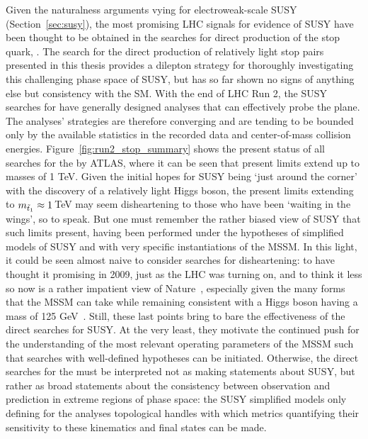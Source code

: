 Given the naturalness arguments vying for electroweak-scale SUSY (Section~\ref{sec:susy}),
the most promising LHC signals for evidence of SUSY have been thought to be obtained in the searches for direct production
of the stop quark, \stopone.
The search for the direct production of relatively light stop pairs presented in this thesis provides a dilepton
strategy for thoroughly investigating this challenging phase space of SUSY, but has so far shown no signs of anything else
but consistency with the SM.
With the end of LHC Run 2, the SUSY searches for \stopone have generally designed analyses that can effectively
probe the \msn plane.
The analyses' strategies are therefore converging and are tending to be bounded only by the available statistics
in the recorded data and center-of-mass collision energies.
Figure~\ref{fig:run2_stop_summary} shows the present status of all searches for the \stopone by ATLAS,
where it can be seen that present limits extend up to \stopone masses of 1 TeV.
Given the initial hopes for SUSY being `just around the corner' with the discovery of a relatively light Higgs boson,
the present limits extending to $m_{\tilde{t}_1} \approx 1$\,TeV may seem disheartening to those who
have been `waiting in the wings', so to speak.
But one must remember the rather biased view of SUSY that such limits present, having been performed
under the hypotheses of simplified models of SUSY and with very specific instantiations of the MSSM.
In this light, it could be seen almost naive to consider searches for \stopone disheartening:
to have thought it promising in 2009, just as the LHC was turning on, and to think it less so now
is a rather impatient view of Nature~\cite{FengNaturalness}, especially given the many forms that the MSSM
can take while remaining consistent with a Higgs boson having a mass of 125 GeV~\cite{SUSYPrimer}.
Still, these last points bring to bare the effectiveness of the direct searches for SUSY.
At the very least, they motivate the continued push for the understanding of the most relevant
operating parameters of the MSSM such that searches with well-defined hypotheses can
be initiated.
Otherwise, the direct searches for the \stopone must be interpreted not as making statements
about SUSY, but rather as broad statements about the consistency between observation and prediction in extreme regions of phase space:
the SUSY simplified models only defining for the analyses topological handles with which metrics
quantifying their sensitivity to these kinematics and final states can be made.

